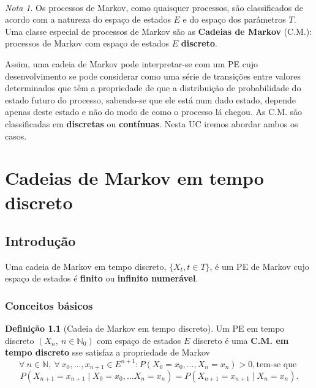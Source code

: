 \documentclass[
  11pt,
  a4paper,
]{book}
\theoremstyle{definition}
\newtheorem{definition}{Definição}[chapter]
\theoremstyle{definition}
\theoremstyle{definition}
\theoremstyle{definition}
\theoremstyle{remark}
\newtheorem*{remark}{Nota }
\begin{document}
\(\,\)

\begin{remark}
Os processos de Markov, como quaisquer processos, são classificados de acordo com a natureza do espaço de estados \(E\) e do espaço dos parâmetros \(T\). Uma classe especial de processos de Markov são as \textbf{Cadeias de Markov} (C.M.): processos de Markov com espaço de estados \(E\) \textbf{discreto}.

Assim, uma cadeia de Markov pode interpretar-se com um PE cujo desenvolvimento se pode considerar como uma série de transições entre valores determinados que têm a propriedade de que a distribuição de probabilidade do estado futuro do processo, sabendo-se que ele está num dado estado, depende apenas deste estado e não do modo de como o processo lá chegou. As C.M. são classificadas em \textbf{discretas} ou \textbf{contínuas}. Nesta UC iremos abordar ambos os casos.
\end{remark}

\chapter{Cadeias de Markov em tempo discreto}\label{cadeias-de-markov-em-tempo-discreto}

\section{Introdução}\label{introduuxe7uxe3o-1}

Uma cadeia de Markov em tempo discreto, \(\{X_t, t \in T\}\), é um PE de Markov cujo espaço de estados é \textbf{finito} ou \textbf{infinito numerável}.

\subsection{Conceitos básicos}\label{conceitos-buxe1sicos}

\begin{definition}[Cadeia de Markov em tempo discreto]
Um PE em tempo discreto \((X_n, ~n \in \mathbb{N}_0)\) com espaço de estados \(E\) discreto é uma \textbf{C.M. em tempo discreto} sse satisfaz a propriedade de Markov
\[\forall ~n \in \mathbb{N}, ~\forall ~x_0, \ldots, x_{n+1} \in E^{n+1}: P(X_0=x_0, \ldots, X_n=x_n)>0, \text{tem-se que }\] \[P(X_{n+1}=x_{n+1} \mid X_{0}=x_0, \ldots X_{n}=x_n)=P(X_{n+1}=x_{n+1} \mid X_{n}=x_n).\]
\end{definition}

\(\,\)
\end{document}
